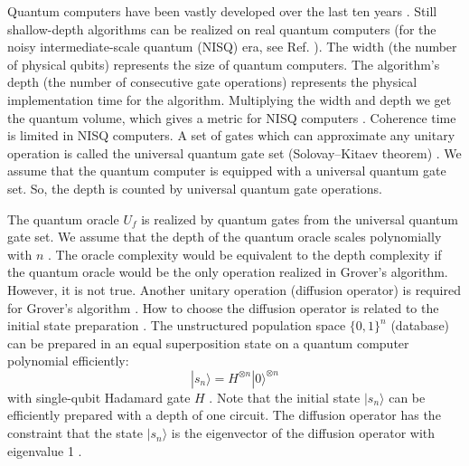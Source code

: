 \documentclass[%
 twocolumn,
 10pt,
 superscriptaddress,
 longbibliography,
 amsmath,amssymb,
 aps,
 pra,
floatfix,
]{revtex4-1}
\begin{document}
Quantum computers have been vastly developed over the last ten years \cite{Barends14,BHLSL16,FMLLDM17,Arute19}. Still shallow-depth algorithms can be realized on real quantum computers (for the noisy intermediate-scale quantum (NISQ) era, see Ref. \cite{Preskill18}). The width (the number of physical qubits) represents the size of quantum computers. The algorithm's depth (the number of consecutive  gate operations) represents the physical implementation time for the algorithm. Multiplying the width and depth we get the quantum volume, which gives a metric for NISQ computers \cite{CBSNG19}. Coherence time is limited in NISQ computers. A set of gates which can approximate any unitary operation is called the universal quantum gate set (Solovay–Kitaev theorem) \cite{NC10}. We assume that the quantum computer is equipped with a universal quantum gate set. So, the depth is counted by universal quantum gate operations.

The quantum oracle $U_f$ is realized by quantum gates from the universal quantum gate set. We assume that the depth of the quantum oracle scales polynomially with $n$ \cite{FMLLDM17}. The oracle complexity would be equivalent to the depth complexity if the quantum oracle would be the only operation realized in Grover's algorithm. However, it is not true. Another unitary operation (diffusion operator) is required for Grover's algorithm \cite{Grover97,GK17}. How to choose the diffusion operator is related to the initial state preparation \cite{Grover98,BHMT00}. The unstructured population space $\{0,1\}^n$ (database) can be prepared in an equal superposition state on a quantum computer polynomial efficiently:
\begin{equation}
	\label{def s n}
	|s_n\rangle=H^{\otimes n}|0\rangle^{\otimes n}
\end{equation}
with single-qubit Hadamard gate $H$ \cite{NC10}. Note that the initial state $|s_n\rangle$ can be efficiently prepared with a depth of one circuit. The diffusion operator has the constraint that the state $|s_n\rangle$ is the eigenvector of the diffusion operator with eigenvalue 1 \cite{Tulsi12,Tulsi15}.
\end{document}
